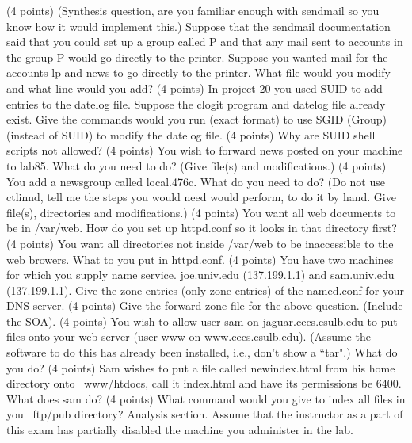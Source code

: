\vskip 1.2in
\ques
(4 points)
(Synthesis question, are you familiar enough with sendmail so you
know how it would implement this.)
Suppose that the sendmail documentation said that you could
set up a group called {\ltt{}P} and that any mail sent to
accounts in the group {\ltt{}P} would go directly to the printer.
Suppose you wanted mail for the accounts {\ltt{}lp} and {\ltt{}news}
to go directly to the printer.
What file would you modify and what line would you add?
\vskip 1.0in
\ques
(4 points)
In project 20 you used SUID to add entries to the {\ltt{}datelog} file.
Suppose the {\ltt{}clogit} program and {\ltt{}datelog} file already exist.
Give the commands would you run (exact format) to use SGID (Group)
(instead of SUID) to modify the {\ltt{}datelog} file.
\vfill\eject
\ques
(4 points)
Why are SUID shell scripts not allowed?
\vskip 1.0in
\ques
(4 points)
You wish to forward news posted on your machine to {\ltt{}lab85}.
What do you need to do? (Give file(s) and modifications.)
\vskip 1.0in
\ques
(4 points)
You add a newsgroup called {\ltt{}local.476c}.
What do you need to do? (Do not use {\ltt{}ctlinnd}, tell me the
steps you would need would perform, to do it by hand. 
Give file(s), directories and modifications.)
\vskip 1.5in
\ques
(4 points)
You want all web documents to be in {\ltt{}/var/web}.
How do you set up {\ltt{}httpd.conf} so it looks in that directory first?
\vskip 1.0in
\ques
(4 points)
You want all directories not inside {\ltt{}/var/web} to be inaccessible to the
web browers.
What to you put in {\ltt{}httpd.conf}.
\vfill\eject
\ques
(4 points)
You have two machines for which you supply name service.
{\ltt{}joe.univ.edu} (137.199.1.1) and {\ltt{}sam.univ.edu} (137.199.1.1).
Give the zone entries (only zone entries) of the {\ltt{}named.conf}
for your DNS server.
\vfill
\ques
(4 points)
Give the forward zone file for the above question. (Include the SOA).
\vfill
\ques
(4 points)
You wish to allow user {\ltt{}sam} on {\ltt{}jaguar.cecs.csulb.edu}
to put files onto your web server (user {\ltt{}www} on 
{\ltt{}www.cecs.csulb.edu}). (Assume the software to do this has
already been installed, i.e., don't show a ``tar".)
What do you do?
\vskip 0.7in\eject
\ques
(4 points)
Sam wishes to put a file called {\ltt{}newindex.html} from his home directory
onto {\ltt{}~www/htdocs}, call it {\ltt{}index.html} and have its
permissions be {\ltt{}6400}. What does sam do?
\vskip 3.0in
\ques
(4 points)
What command would you give to index all files in you {\ltt{}~ftp/pub}
directory?
\vskip 0.5in
Analysis section. Assume that the instructor as a part of this exam
has partially disabled the machine you administer in the lab.

